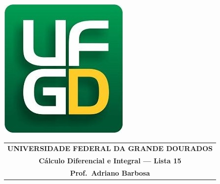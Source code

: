 \documentclass[a4paper,5pt]{amsbook}
\begin{document}
\thispagestyle{empty}
\pagestyle{empty}
\begin{minipage}[h]{0.14\textwidth}
	\includegraphics[scale=0.24]{../ufgd.png}
\end{minipage}
\begin{minipage}[h]{\textwidth}
\begin{tabular}{c}
{{\bf UNIVERSIDADE FEDERAL DA GRANDE DOURADOS}}\\
{{\bf C\'alculo Diferencial e Integral --- Lista 15}}\\
{{\bf Prof.\ Adriano Barbosa}}\\
\end{tabular}
\vspace{-0.45cm}
%
\end{minipage}

\end{document}
